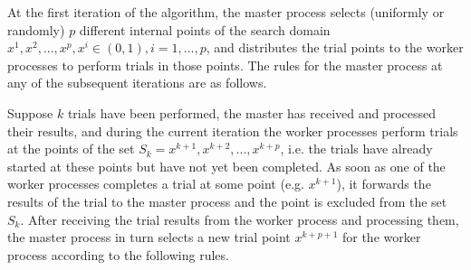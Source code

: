 \documentclass[runningheads]{llncs}
\begin{document}
At the first iteration of the algorithm, the master process selects (uniformly or randomly) $p$ different internal points of the search domain ${x^1, x^2, ..., x^p}, x^i \in (0,1), i=1, ..., p$, and distributes the trial points to the worker processes to perform trials in those points. The rules for the master process at any of the subsequent iterations are as follows. 

Suppose $k$ trials have been performed, the master has received and processed their results, and during the current iteration the worker processes perform trials at the points of the set $S_k={x^{k+1}, x^{k+2},..., x^{k+p}}$, i.e. the trials have already started at these points but have not yet been completed. As soon as one of the worker processes completes a trial at some point (e.g. $x^{k+1}$), it forwards the results of the trial to the master process and the point is excluded from the set $S_k$. After receiving the trial results from the worker process and processing them, the master process in turn selects a new trial point $x^{k+p+1}$ for the worker process according to the following rules.
\end{document}
